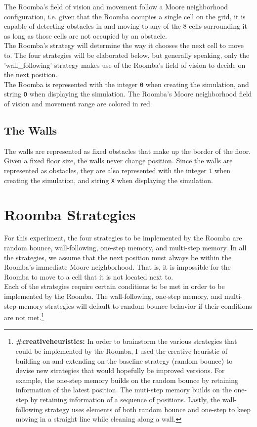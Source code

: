 \documentclass[11pt]{article}
\begin{document}
The Roomba's field of vision and movement follow a Moore neighborhood
configuration, i.e. given that the Roomba occupies a single cell on the
grid, it is capable of detecting obstacles in and moving to any of the 8
cells surrounding it as long as those cells are not occupied by an
obstacle.\\

The Roomba's strategy will determine the way it chooses the next cell to
move to. The four strategies will be elaborated below, but generally
speaking, only the 'wall\_following' strategy makes use of the Roomba's
field of vision to decide on the next position.\\

The Roomba is represented with the integer \texttt{0} when creating the
simulation, and string \texttt{O} when displaying the simulation. The
Roomba's Moore neighborhood field of vision and movement range are
colored in red.

\subsection{The Walls}

The walls are represented as fixed obstacles that make up the border of
the floor. Given a fixed floor size, the walls never change position.
Since the walls are represented as obstacles, they are also represented
with the integer \texttt{1} when creating the simulation, and string
\texttt{X} when displaying the simulation.

\newpage
\section{Roomba Strategies}

For this experiment, the four strategies to be implemented by the Roomba
are random bounce, wall-following, one-step memory, and multi-step
memory. In all the strategies, we assume that the next position must
always be within the Roomba's immediate Moore neighborhood. That is, it
is impossible for the Roomba to move to a cell that it is not located
next to.\\

Each of the strategies require certain conditions to be met in order to
be implemented by the Roomba. The wall-following, one-step memory, and
multi-step memory strategies will default to random bounce behavior if
their conditions are not met.\footnote{\textbf{\#creativeheuristics:} In order to brainstorm the various strategies that could be implemented by the Roomba, I used the creative heuristic of building on and extending on the baseline strategy (random bounce) to devise new strategies that would hopefully be improved versions. For example, the one-step memory builds on the random bounce by retaining information of the latest position. The muti-step memory builds on the one-step by retaining information of a sequence of positions. Lastly, the wall-following strategy uses elements of both random bounce and one-step to keep moving in a straight line while cleaning along a wall.}
\end{document}

